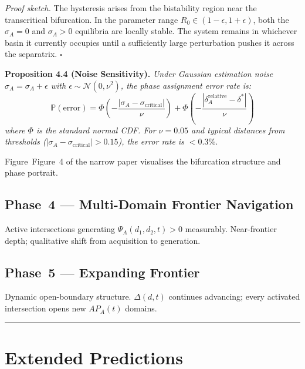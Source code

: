 \documentclass[11pt]{article}
\theoremstyle{definition}
\theoremstyle{plain}
\begin{document}
\textit{Proof sketch.} The hysteresis arises from the bistability region
near the transcritical bifurcation. In the parameter range
$R_0 \in (1 - \epsilon, 1 + \epsilon)$, both the $\sigma_A = 0$ and
$\sigma_A > 0$ equilibria are locally stable. The system remains in
whichever basin it currently occupies until a sufficiently large
perturbation pushes it across the separatrix. $\square$

\textbf{Proposition 4.4 (Noise Sensitivity).} %
\textit{Under Gaussian estimation noise $\hat{\sigma}_A = \sigma_A + \epsilon$
with $\epsilon \sim \mathcal{N}(0, \nu^2)$, the phase assignment error rate is:
\begin{equation}\label{eq:phase-error-rate}
\mathbb{P}(\text{error}) = \Phi\!\left(-\frac{|\sigma_A - \sigma_{\text{critical}}|}{\nu}\right) + \Phi\!\left(-\frac{|\delta_A^{\text{relative}} - \delta^*|}{\nu}\right)
\end{equation}
where $\Phi$ is the standard normal CDF. For $\nu = 0.05$ and typical
distances from thresholds ($|\sigma_A - \sigma_{\text{critical}}| > 0.15$),
the error rate is $< 0.3\%$.}



Figure~Figure~4 of the narrow paper visualises the bifurcation structure and phase portrait.

\subsection*{Phase~4 --- Multi-Domain Frontier Navigation}

Active intersections generating $\Psi_A(d_1,d_2,t) > 0$ measurably.
Near-frontier depth; qualitative shift from acquisition to generation.

\subsection*{Phase~5 --- Expanding Frontier}

Dynamic open-boundary structure. $\Delta(d,t)$ continues advancing;
every activated intersection opens new $AP_A(t)$ domains.

\noindent\rule{\linewidth}{0.4pt}



\section{Extended Predictions}\label{sec:predictions}
\end{document}
